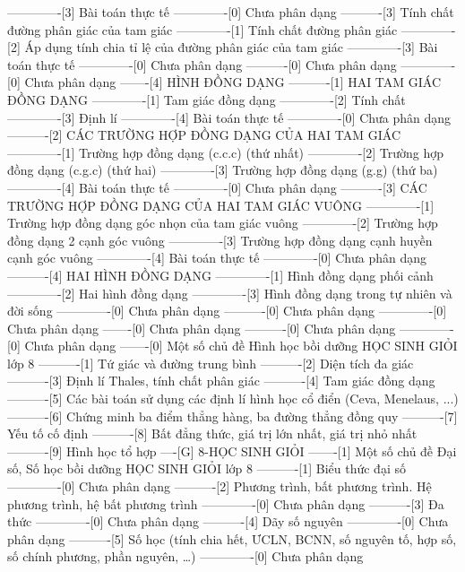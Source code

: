 -------------[3] Bài toán thực tế
-------------[0] Chưa phân dạng
----------[3] Tính chất đường phân giác của tam giác
-------------[1] Tính chất đường phân giác
-------------[2] Áp dụng tính chia tỉ lệ của đường phân giác của tam giác
-------------[3] Bài toán thực tế
-------------[0] Chưa phân dạng
----------[0] Chưa phân dạng
-------------[0] Chưa phân dạng
-------[4] HÌNH ĐỒNG DẠNG
----------[1] HAI TAM GIÁC ĐỒNG DẠNG
-------------[1] Tam giác đồng dạng
-------------[2] Tính chất
-------------[3] Định lí
-------------[4] Bài toán thực tế
-------------[0] Chưa phân dạng
----------[2] CÁC TRƯỜNG HỢP ĐỒNG DẠNG CỦA HAI TAM GIÁC
-------------[1] Trường hợp đồng dạng (c.c.c) (thứ nhất)
-------------[2] Trường hợp đồng dạng (c.g.c) (thứ hai)
-------------[3] Trường hợp đồng dạng (g.g) (thứ ba)
-------------[4] Bài toán thực tế
-------------[0] Chưa phân dạng
----------[3] CÁC TRƯỜNG HỢP ĐỒNG DẠNG CỦA HAI TAM GIÁC VUÔNG
-------------[1] Trường hợp đồng dạng góc nhọn của tam giác vuông
-------------[2] Trường hợp đồng dạng 2 cạnh góc vuông
-------------[3] Trường hợp đồng dạng cạnh huyền cạnh góc vuông
-------------[4] Bài toán thực tế
-------------[0] Chưa phân dạng
----------[4] HAI HÌNH ĐỒNG DẠNG
-------------[1] Hình đồng dạng phối cảnh
-------------[2] Hai hình đồng dạng
-------------[3] Hình đồng dạng trong tự nhiên và đời sống
-------------[0] Chưa phân dạng
----------[0] Chưa phân dạng
-------------[0] Chưa phân dạng
-------[0] Chưa phân dạng
----------[0] Chưa phân dạng
-------------[0] Chưa phân dạng
-------[0] Một số chủ đề Hình học bồi dưỡng HỌC SINH GIỎI lớp 8
----------[1] Tứ giác và đường trung bình
----------[2] Diện tích đa giác
----------[3] Định lí Thales, tính chất phân giác
----------[4] Tam giác đồng dạng
----------[5] Các bài toán sử dụng các định lí hình học cổ điển (Ceva, Menelaus, ...)
----------[6] Chứng minh ba điểm thẳng hàng, ba đường thẳng đồng quy
----------[7] Yếu tố cố định
----------[8] Bất đẳng thức, giá trị lớn nhất, giá trị nhỏ nhất
----------[9] Hình học tổ hợp
----[G] 8-HỌC SINH GIỎI
-------[1] Một số chủ đề Đại số, Số học bồi dưỡng HỌC SINH GIỎI lớp 8
----------[1] Biểu thức đại số
-------------[0] Chưa phân dạng
----------[2] Phương trình, bất phương trình. Hệ phương trình, hệ bất phương trình
-------------[0] Chưa phân dạng
----------[3] Đa thức
-------------[0] Chưa phân dạng
----------[4] Dãy số nguyên
-------------[0] Chưa phân dạng
----------[5] Số học (tính chia hết, ƯCLN, BCNN, số nguyên tố, hợp số, số chính phương, phần nguyên, \ldots)
-------------[0] Chưa phân dạng
